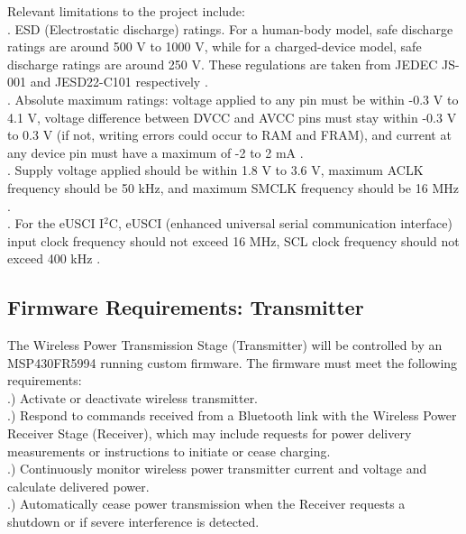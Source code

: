\documentclass[12pt]{article}
\begin{document}
\noindent
Relevant limitations to the project include:\\

. ESD (Electrostatic discharge) ratings. For a human-body model, safe discharge ratings are around 500 V to 1000 V, while for a charged-device model, safe discharge ratings are around 250 V. These regulations are taken from JEDEC JS-001 and JESD22-C101 respectively \cite{MSP430FR599x}.\\

. Absolute maximum ratings: voltage applied to any pin must be within -0.3 V to 4.1 V, voltage difference between DVCC and AVCC pins must stay within -0.3 V to 0.3 V (if not, writing errors could occur to RAM and FRAM), and current at any device pin must have a maximum of  -2 to 2 mA \cite{MSP430FR599x}.\\

. Supply voltage applied should be within 1.8 V to 3.6 V, maximum ACLK frequency should be 50 kHz, and maximum SMCLK frequency should be 16 MHz \cite{MSP430FR599x}.\\

. For the eUSCI I$^2$C, eUSCI (enhanced universal serial communication interface) input clock frequency should not exceed 16 MHz, SCL clock frequency should not exceed 400 kHz \cite{MSP430FR599x}.


\subsection{Firmware Requirements: Transmitter}

\indent \indent
The Wireless Power Transmission Stage (Transmitter) will be controlled by an MSP430FR5994 running custom firmware. The firmware must meet the following requirements:\\

.) Activate or deactivate wireless transmitter.\\

.) Respond to commands received from a Bluetooth link with the Wireless Power Receiver Stage (Receiver), which may include requests for power delivery measurements or instructions to initiate or cease charging.\\

.) Continuously monitor wireless power transmitter current and voltage and calculate delivered power.\\

.) Automatically cease power transmission when the Receiver requests a shutdown or if severe interference is detected.\\
\end{document}
